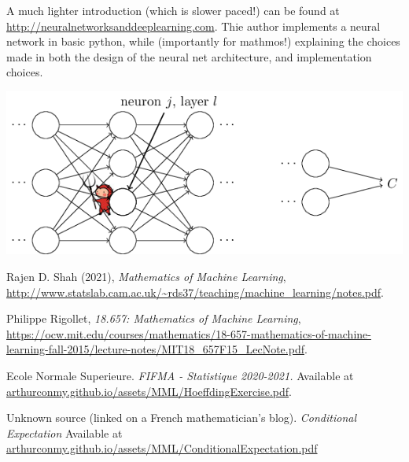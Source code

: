 \documentclass[11pt]{scrartcl}
\begin{document}
\begin{remark}
A much lighter introduction (which is slower paced!) can be found at \url{http://neuralnetworksanddeeplearning.com}. Thie author implements a neural network in basic python, while (importantly for mathmos!) explaining the choices made in both the design of the neural net architecture, and implementation choices.

\begin{center}
\includegraphics[scale=0.5]{demon2.png}
    \label{fig:demon}
\end{center}

\end{remark}

\begin{thebibliography}{9}
Rajen D. Shah (2021), \emph{Mathematics of Machine Learning}, \url{http://www.statslab.cam.ac.uk/~rds37/teaching/machine_learning/notes.pdf}.

Philippe Rigollet, \emph{18.657: Mathematics of Machine Learning}, \url{https://ocw.mit.edu/courses/mathematics/18-657-mathematics-of-machine-learning-fall-2015/lecture-notes/MIT18_657F15_LecNote.pdf}.

Ecole Normale Superieure.
\emph{FIFMA - Statistique 2020-2021.}
Available at \url{arthurconmy.github.io/assets/MML/HoeffdingExercise.pdf}.

Unknown source (linked on a French mathematician's blog).
\emph{Conditional Expectation}
Available at \url{arthurconmy.github.io/assets/MML/ConditionalExpectation.pdf} %
\end{thebibliography}
\end{document}
